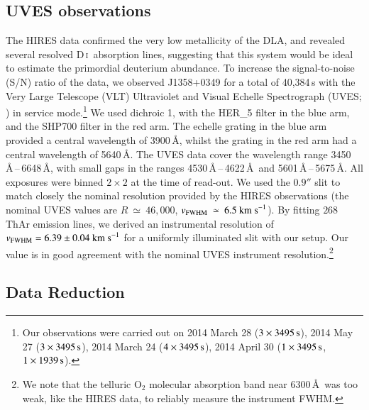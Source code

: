 \documentclass[12pt,preprint,useAMS,usenatbib]{emulateapj}
\newcommand{\DI}{\textrm{D}\,\textsc{i}}
\begin{document}
\subsection{UVES observations}

The HIRES data confirmed the very low metallicity of the DLA,
and revealed several resolved \DI\ absorption lines, suggesting
that this system would be ideal to estimate the primordial deuterium
abundance. To increase the signal-to-noise (S/N) ratio of the data,
we observed J1358+0349 for a total of 40,384\,s with the
Very Large Telescope (VLT) Ultraviolet and Visual Echelle
Spectrograph (UVES; \citealt{Dek00}) in service mode.\footnote{Our
observations were carried out on
2014 March 28 ($3\times3495\,{\rm s}$),
2014 May 27 ($3\times3495\,{\rm s}$),
2014 March 24 ($4\times3495\,{\rm s}$),
2014 April 30 ($1\times3495\,{\rm s}$, $1\times1939\,{\rm s}$).}
We used dichroic 1, with the HER\_5 filter in the blue arm, and
the SHP700 filter in the red arm. The echelle grating in the blue
arm provided a central wavelength of 3900\,\AA, whilst the grating
in the red arm had a central wavelength of 5640\,\AA. The UVES
data cover the wavelength range 3450\,\AA\,--\,6648\,\AA, with small
gaps in the ranges 4530\,\AA\,--\,4622\,\AA\ and 5601\,\AA\,--\,5675\,\AA.
All exposures were binned $2\times2$ at the time of read-out.
We used the $0.9''$ slit to match closely the nominal resolution
provided by the HIRES observations (the nominal UVES values
are $R~\simeq~46,000$, $v_{\rm FWHM}~\simeq~6.5~{\rm km~s}^{-1}$).
By fitting $268$ ThAr emission lines, we derived an instrumental
resolution of $v_{\rm FWHM}=6.39\pm0.04~{\rm km~s}^{-1}$
for a uniformly illuminated slit with our setup. Our value is in good
agreement with the nominal UVES instrument resolution.\footnote{We note that
the telluric O$_{2}$ molecular absorption band near 6300\,\AA\ was
too weak, like the HIRES data, to reliably measure the instrument
FWHM.}


\subsection{Data Reduction}
\end{document}
